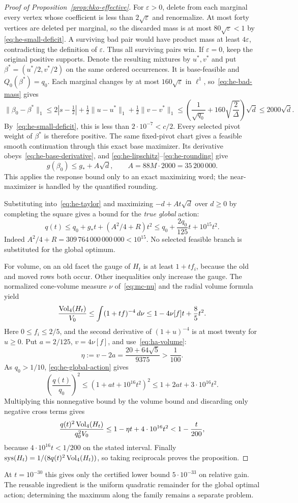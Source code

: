 \begin{proof}[Proof of Proposition~\ref{prop:hko-effective}]
For $\varepsilon>0$, delete from each marginal every vertex whose
coefficient is less than $2\sqrt\varepsilon$ and renormalize.
At most forty vertices are deleted per marginal, so the discarded
mass is at most $80\sqrt\varepsilon<1$ by
\eqref{eq:he-small-deficit}. A surviving bad pair would have product
mass at least $4\varepsilon$, contradicting the definition of
$\varepsilon$. Thus all surviving pairs win. If $\varepsilon=0$,
keep the original positive supports. Denote the resulting mixtures
by $u^*,v^*$ and put $\beta^*=(u^*/2,v^*/2)$ on the same ordered
occurrences. It is base-feasible and $Q_0(\beta^*)=q_0$.
Each marginal changes by at most $160\sqrt\varepsilon$ in
$\ell^1$, so~\eqref{eq:he-bad-mass} gives
\begin{equation}\label{eq:he-rounding}
 \|\beta_0-\beta^*\|_1
 \leq 2|s-\tfrac12|
       +\tfrac12\|u-u^*\|_1+\tfrac12\|v-v^*\|_1
 \leq\left(\frac1{\sqrt{q_0}}
             +160\sqrt{\frac2\Delta}\right)\sqrt d
 \leq2000\sqrt d.
\end{equation}
By~\eqref{eq:he-small-deficit}, this is less than
$2\cdot10^{-7}<c/2$. Every selected pivot weight of $\beta^*$
is therefore positive. The same fixed-pivot chart gives a feasible
smooth continuation through this exact base maximizer.
Its derivative obeys~\eqref{eq:he-base-derivative}, and
\eqref{eq:he-lipschitz}--\eqref{eq:he-rounding} give
\[
 g(\beta_0)\leq g_*+A\sqrt d,\qquad
 A=88M\cdot2000=35\,200\,000.
\]
This applies the response bound only to an exact maximizing word;
the near-maximizer is handled by the quantified rounding.

Substituting into~\eqref{eq:he-taylor} and maximizing
$-d+At\sqrt d$ over $d\geq0$ by completing the square gives a
bound for the \emph{true global} action:
\begin{equation}\label{eq:he-global-action}
 q(t)\leq q_0+g_*t+(A^2/4+R)t^2
       \leq q_0+\frac{2q_0}{125}t+10^{15}t^2.
\end{equation}
Indeed $A^2/4+R=309\,764\,000\,000\,000<10^{15}$.
No selected feasible branch is substituted for the global optimum.

For volume, on an old facet the gauge of $H_t$ is at least
$1+tf_i$, because the old and moved rows both occur. Other
inequalities only increase the gauge. The normalized cone-volume
measure $\nu$ of~\eqref{eq:mc-nu} and the radial volume formula yield
\[
 \frac{\operatorname{Vol}_4(H_t)}{V_0}
 \leq\int(1+tf)^{-4}\,d\nu
 \leq1-4\nu[f]t+\frac85t^2.
\]
Here $0\leq f_i\leq2/5$, and the second derivative of
$(1+u)^{-4}$ is at most twenty for $u\geq0$.
Put $a=2/125$, $v=4\nu[f]$, and use~\eqref{eq:ha-volume}:
\[
 \eta:=v-2a=\frac{20+64\sqrt5}{9375}>\frac1{100}.
\]
As $q_0>1/10$, \eqref{eq:he-global-action} gives
\[
 \left(\frac{q(t)}{q_0}\right)^2
 \leq(1+at+10^{16}t^2)^2
 \leq1+2at+3\cdot10^{16}t^2.
\]
Multiplying this nonnegative bound by the volume bound and
discarding only negative cross terms gives
\[
 \frac{q(t)^2\operatorname{Vol}_4(H_t)}{q_0^2V_0}
 \leq1-\eta t+4\cdot10^{16}t^2
 <1-\frac{t}{200},
\]
because $4\cdot10^{16}t<1/200$ on the stated interval.
Finally $\operatorname{sys}(H_t)=1/(8q(t)^2\operatorname{Vol}_4(H_t))$,
so taking reciprocals proves the proposition.
\end{proof}

At $t=10^{-30}$ this gives only the certified lower bound
$5\cdot10^{-33}$ on relative gain. The reusable ingredient is the
uniform quadratic remainder for the global optimal action; determining
the maximum along the family remains a separate problem.
